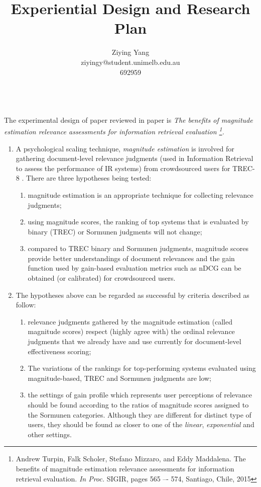 \documentclass{article}
\title{\Large{\textbf{Experiential Design and Research Plan}}} %
\author{Ziying Yang\\\small{ziyingy@student.unimelb.edu.au}\\\small{692959}\\}
\date{}
\begin{document}
\maketitle

\\[1em]
The experimental design of paper reviewed in paper is \textit{The benefits of magnitude estimation relevance assessments for information retrieval evaluation \footnote{Andrew Turpin, Falk Scholer, Stefano Mizzaro, and Eddy Maddalena. The benefits of magnitude estimation relevance assessments for information retrieval evaluation. \textit{In Proc.} SIGIR, pages 565 –- 574, Santiago, Chile, 2015}.}
\begin{enumerate}
\item A psychological scaling technique, \textit{magnitude estimation} is involved for gathering document-level relevance judgments (used in Information Retrieval to assess the performance of IR systems) from crowdsourced users for TREC-8 \cite{trec8}. There are three hypotheses being tested:
	\begin{enumerate}
	\item magnitude estimation is an appropriate technique for collecting relevance judgments;
	\item using magnitude scores, the ranking of top systems that is evaluated by binary (TREC) \cite{trec8} or Sormunen judgments \cite{Sormunen} will not change;
	\item compared to TREC binary and Sormunen judgments, magnitude scores provide better understandings of document relevances and the gain function used by gain-based evaluation metrics such as nDCG can be obtained (or calibrated) for crowdsourced users.
	\end{enumerate}
\item The hypotheses above can be regarded as successful by criteria described as follow:
	\begin{enumerate}
	\item relevance judgments gathered by the magnitude estimation (called magnitude scores) respect (highly agree with) the ordinal relevance judgments that we already have and use currently for document-level effectiveness scoring;
	\item The variations of the rankings for top-performing systems evaluated using magnitude-based, TREC and Sormunen judgments are low;
	\item the settings of gain profile which represents user perceptions of relevance should be found according to the ratios of magnitude scores assigned to the Sormunen categories. Although they are different for distinct type of users, they should be found as closer to one of the \textit{linear}, \textit{exponential} and other settings.

\end{enumerate}
\end{enumerate}
\end{document}
